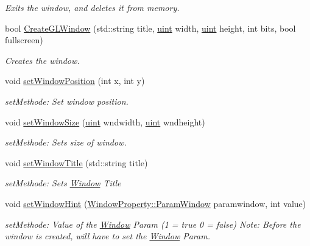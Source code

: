 \begin{DoxyCompactItemize}
\begin{DoxyCompactList}\small\item\em Exits the window, and deletes it from memory. \item\end{DoxyCompactList}\item 
bool \hyperlink{class_f2_c_1_1_window_aaf0f8a2b7bf33c732dc32ca862fc8dac}{CreateGLWindow} (std::string title, \hyperlink{namespace_f2_c_a58be2bac9eb3e3c99cb41b6008bf4fae}{uint} width, \hyperlink{namespace_f2_c_a58be2bac9eb3e3c99cb41b6008bf4fae}{uint} height, int bits, bool fullscreen)
\begin{DoxyCompactList}\small\item\em Creates the window. \item\end{DoxyCompactList}\item 
void \hyperlink{class_f2_c_1_1_window_a1386414654c4e87f67f31076a8b34aa5}{setWindowPosition} (int x, int y)
\begin{DoxyCompactList}\small\item\em setMethode: Set window position. \item\end{DoxyCompactList}\item 
void \hyperlink{class_f2_c_1_1_window_a31ea5cf746375e50bbc3d547eb249155}{setWindowSize} (\hyperlink{namespace_f2_c_a58be2bac9eb3e3c99cb41b6008bf4fae}{uint} wndwidth, \hyperlink{namespace_f2_c_a58be2bac9eb3e3c99cb41b6008bf4fae}{uint} wndheight)
\begin{DoxyCompactList}\small\item\em setMethode: Sets size of window. \item\end{DoxyCompactList}\item 
void \hyperlink{class_f2_c_1_1_window_a7d8c67d945748f4a2c2effcf4a29022d}{setWindowTitle} (std::string title)
\begin{DoxyCompactList}\small\item\em setMethode: Sets \hyperlink{class_f2_c_1_1_window}{Window} Title \item\end{DoxyCompactList}\item 
void \hyperlink{class_f2_c_1_1_window_a8d5436c04afd4ea15ea541ff90d77138}{setWindowHint} (\hyperlink{namespace_f2_c_1_1_window_property_a89ec69d0a86f9d0063dfb69a3ebf3fbe}{WindowProperty::ParamWindow} paramwindow, int value)
\begin{DoxyCompactList}\small\item\em setMethode: Value of the \hyperlink{class_f2_c_1_1_window}{Window} Param (1 = true 0 = false) Note: Before the window is created, will have to set the \hyperlink{class_f2_c_1_1_window}{Window} Param. \item\end{DoxyCompactList}\item 

\end{DoxyCompactItemize}
